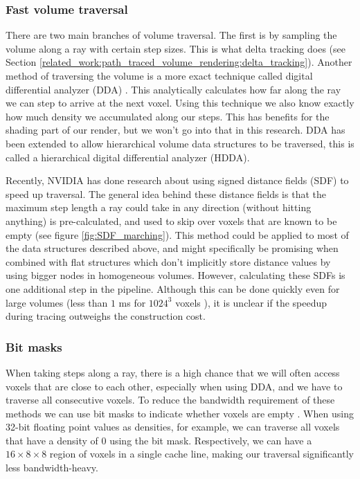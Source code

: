 \subsubsection{Fast volume traversal} \label{related_work:attribute_separation:fast_volume_traversal}
There are two main branches of volume traversal. The first is by sampling the volume along a ray with certain step sizes. This is what delta tracking does (see Section \ref{related_work:path_traced_volume_rendering:delta_tracking}). Another method of traversing the volume is a more exact technique called digital differential analyzer (DDA) \cite{amanatides1987fast}. This analytically calculates how far along the ray we can step to arrive at the next voxel. Using this technique we also know exactly how much density we accumulated along our steps. This has benefits for the shading part of our render, but we won't go into that in this research. DDA has been extended to allow hierarchical volume data structures to be traversed, this is called a hierarchical digital differential analyzer (HDDA)\cite{laine2010efficient}.


Recently, NVIDIA has done research about using signed distance fields (SDF) to speed up traversal\cite{soderlund2022ray}. The general idea behind these distance fields is that the maximum step length a ray could take in any direction (without hitting anything) is pre-calculated, and used to skip over voxels that are known to be empty (see figure \ref{fig:SDF_marching}). This method could be applied to most of the data structures described above, and might specifically be promising when combined with flat structures which don't implicitly store distance values by using bigger nodes in homogeneous volumes. However, calculating these SDFs is one additional step in the pipeline. Although this can be done quickly even for large volumes (less than $1$ ms for $1024^3$ voxels \cite{cao2010parallel}), it is unclear if the speedup during tracing outweighs the construction cost.
\subsubsection{Bit  masks} \label{related_work:attribute_separation:bitmasks}
When taking steps along a ray, there is a high chance that we will often access voxels that are close to each other, especially when using DDA, and we have to traverse all consecutive voxels. To reduce the bandwidth requirement of these methods we can use bit masks to indicate whether voxels are empty \cite{van2015real}\cite{museth2013vdb}. When using 32-bit floating point values as densities, for example, we can traverse all voxels that have a density of $0$ using the bit mask. Respectively, we can have a $16\times8\times8$ region of voxels in a single cache line, making our traversal significantly less bandwidth-heavy.

